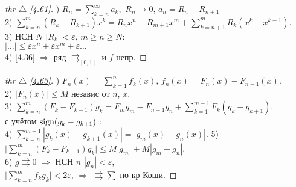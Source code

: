 
\begin{minipage}[t]{0.45\textwidth}
\begin{proof}[
thr $\triangle$
\eqref{4.61}]

\phantom{42}

) $R_n = \sum_{k=n}^{\infty} a_k,$ $R_n \to 0$, $a_n = R_n - R_{n+1}$ \\
2) $\sum_{k=n}^m (R_k - R_{k+1}) x^k = R_n x^n - R_{m+1} x^m + \sum_{k=n+1}^{m} R_k (x^k - x^{k-1}).$ \\
3) НСН $N$ $|R_k|<\varepsilon$, $m \geq n \geq N$: \\
\phantom{42} \hfill $|\dots| \leq \varepsilon x^n + \varepsilon x^m + \varepsilon \dots$ \\
4) \eqref{4.36} $\Rightarrow$ ряд $\rightrightarrows_{[0,1]}$ и $f$ непр.
\end{proof}
\end{minipage}
\hfill
\begin{minipage}[t]{0.45\textwidth}
\begin{proof}[
thr \hypertarget{463link}{$\triangle$}
\eqref{4.63}]

\phantom{42}

) $F_n (x) = \sum_{k=1}^n f_k (x)$, $f_n(x) = F_n(x) - F_{n-1}(x)$.\\
2) $|F_n(x)| \leq M$ независ от $n$, $x$. \\
3) $\sum_{k=n}^m (F_k - F_{k-1}) g_k = F_m g_m - F_{n-1} g_n + \sum_{k=1}^{m-1} F_k (g_k - g_{k+1})$. \\
\phantom{42} \hfill с учётом $\text{sign} (g_k - g_{k+1})$ : \\
4) $\sum_{k=n}^{m-1} |g_k(x) - g_{k+1}(x)| = |g_m(x) - g_n(x)|$.
5) $\big|\sum_{k=n}^m (F_k - F_{k-1}) g_k \big| \leq M|g_m| + M|g_m - g_n|$. \\
6) $g \rightrightarrows 0$ $\Rightarrow$ НСН $n$ $|g_n|<\varepsilon$, \\
$\big|\sum_{k=n}^m f_k g_k \big| < 2 \varepsilon$,
$\Rightarrow$ $\rightrightarrows \sum$ по кр Коши.
\end{proof}
\end{minipage}